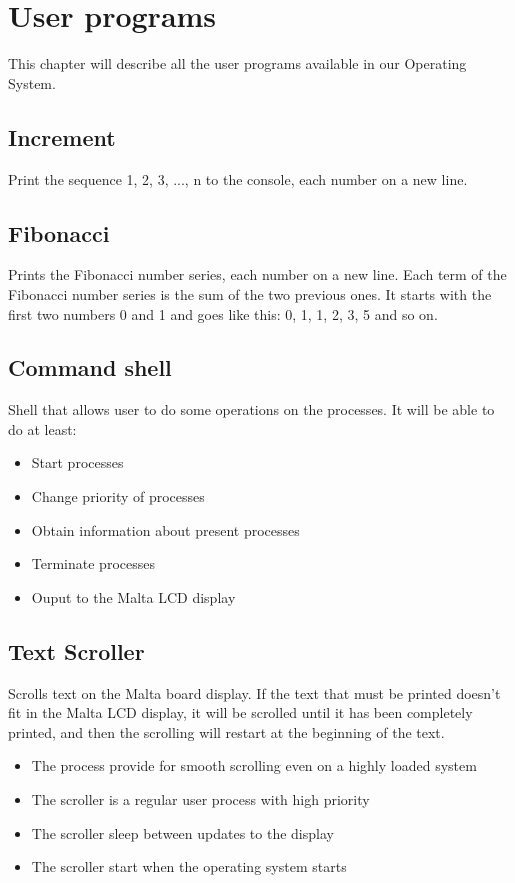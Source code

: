 \chapter{User programs}
This chapter will describe all the user programs available in our Operating System.

\section{Increment}
Print the sequence 1, 2, 3, ..., n to the console, each number on a new line.

\section{Fibonacci}
Prints the Fibonacci number series, each number on a new line.
Each term of the Fibonacci number series is the sum of the two previous ones.
It starts with the first two numbers 0 and 1 and goes like this: 0, 1, 1, 2, 3, 5 and so on.

\section{Command shell}
Shell that allows user to do some operations on the processes.
It will be able to do at least:
\begin{itemize}
	\item{Start processes}
	\item{Change priority of processes}
	\item{Obtain information about present processes}
	\item{Terminate processes}
	\item{Ouput to the Malta LCD display}
\end{itemize}

\section{Text Scroller}
Scrolls text on the Malta board display.
If the text that must be printed doesn't fit in the Malta LCD display, it will be scrolled
until it has been completely printed, and then the scrolling will restart at the beginning
of the text.
\begin{itemize}
	\item{The process provide for smooth scrolling even on a highly loaded system}
	\item{The scroller is a regular user process with high priority}
	\item{The scroller sleep between updates to the display}
	\item{The scroller start when the operating system starts}
\end{itemize}

